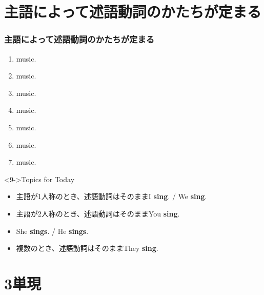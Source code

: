 \documentclass[aspectratio=169,xcolor={dvipsnames,table}]{beamer}
\begin{document}
\section{主語によって述語動詞のかたちが定まる}
\begin{frame}[plain]\frametitle{主語によって述語動詞のかたちが定まる}
  \begin{enumerate}
   \item<1->   music. \hfill{}
   \item<1->   music.
   \item<1->   music.
   \item<1->   music.
   \item<1->   music.
   \item<1->   music.
   \item<1->   music.
  \end{enumerate}
\begin{block}<9->{Topics for Today}\small
\begin{itemize}[square]
 \item<10-> 主語が1人称のとき、述語動詞はそのまま\hfill{I \textbf{sing}. / We \textbf{sing}.}
 \item<11-> 主語が2人称のとき、述語動詞はそのまま\hfill{You \textbf{sing}.}
 \item<12-> \hfill{She \textbf{sings}. / He \textbf{sings}.}
 \item<13->[] \hspace{67.25pt}複数のとき、述語動詞はそのまま\hfill{They \textbf{sing}.}
\end{itemize}
      \end{block}
\end{frame}
\section{3単現}
\end{document}
